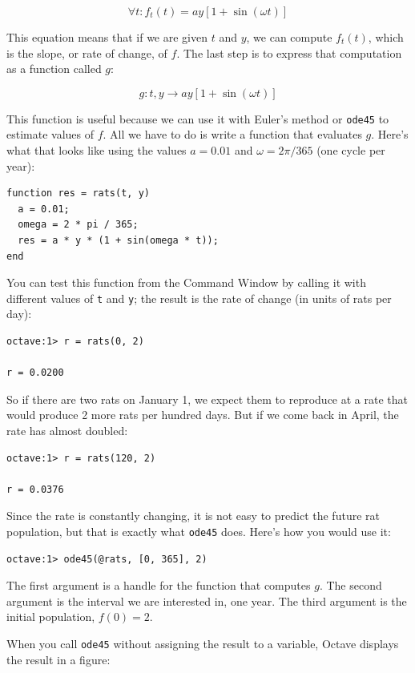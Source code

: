 \documentclass{book}
\begin{document}
\[ \forall t: f_t(t) = a y \left[1 + \sin (\omega t) \right] \]

This equation means that if we are given $t$ and $y$, we can
compute $f_t(t)$, which is the slope, or rate of change, of $f$.
The last step is to express that computation as a function called
$g$:

\[ g : t, y \to a y \left[1 + \sin (\omega t) \right] \]

This function is useful because we can use it with Euler's method
or {\tt ode45} to estimate values of $f$. All we have to
do is write a function that evaluates $g$. Here's what
that looks like using the values $a = 0.01$
and $\omega = 2 \pi/365$ (one cycle per year):

\begin{verbatim}
function res = rats(t, y)
  a = 0.01;
  omega = 2 * pi / 365;
  res = a * y * (1 + sin(omega * t));
end
\end{verbatim}

You can test this function from the Command Window by calling it with
different values of {\tt t} and {\tt y}; the result is the rate of
change (in units of rats per day):

\begin{verbatim}
octave:1> r = rats(0, 2)

r = 0.0200
\end{verbatim}

So if there are two rats on January 1, we expect them to reproduce
at a rate that would produce 2 more rats per hundred days. But
if we come back in April, the rate has almost doubled:

\begin{verbatim}
octave:1> r = rats(120, 2)

r = 0.0376
\end{verbatim}

Since the rate is constantly changing, it is not easy to predict
the future rat population, but that is exactly what {\tt ode45} does.
Here's how you would use it:

\begin{verbatim}
octave:1> ode45(@rats, [0, 365], 2)
\end{verbatim}

The first argument is a handle for the function that
computes $g$. The second argument is the interval we are interested
in, one year. The third argument is the initial population, $f(0) = 2$.

When you call {\tt ode45} without assigning the result to a variable,
Octave displays the result in a figure:
\end{document}
